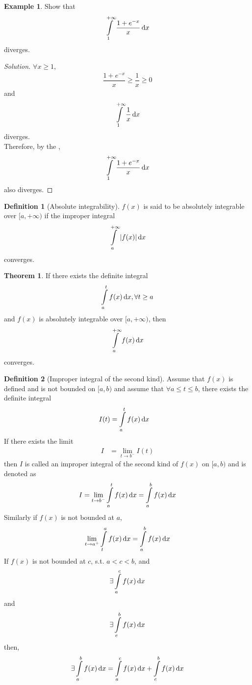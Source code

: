 \documentclass[fleqn, a4paper, 12pt]{article}
\theoremstyle{definition}
\newtheorem{example}{Example}
\newtheorem{definition}{Definition}
\theoremstyle{theorem}
\newtheorem{theorem}{Theorem}
\theoremstyle{remark}
\newenvironment{solution}
{\begin{proof}[Solution]\let\qed\relax}
	{\end{proof}}
\begin{document}
\begin{example}
	Show that \[\int\limits_{1}^{+\infty} \dfrac{1 + e^{-x}}{x} \dif x\] diverges.
\end{example}

\begin{solution}
	$\forall x \geq 1$,
	\begin{align*}
		\dfrac{1 + e^{-x}}{x} \geq \dfrac{1}{x} \geq 0
	\end{align*}
	and \[\int\limits_{1}^{+\infty} \dfrac{1}{x} \dif x\] diverges.\\
	Therefore, by the ,	\[\int\limits_{1}^{+\infty} \dfrac{1 + e^{-x}}{x} \dif x\]
	also diverges.
\end{solution}

\begin{definition}[Absolute integrability]
	$f(x)$ is said to be absolutely integrable over $[a, +\infty)$ if the improper integral
	\[\int\limits_{a}^{+\infty} |f(x)| \dif x\]
	converges.
\end{definition}

\begin{theorem}
	If there exists the definite integral \[\int\limits_{a}^{t} f(x) \dif x, \forall t \geq a\] and $f(x)$ is absolutely integrable over $[a, +\infty)$, then \[\int\limits_{a}^{+\infty} f(x) \dif x\] converges.
\end{theorem}

\begin{definition}[Improper integral of the second kind]
	Assume that $f(x)$ is defined and is not bounded on $[a, b)$ and assume that $\forall a \leq t \leq b$, there exists the definite integral
	\begin{align*}
		I(t) &= \int\limits_{a}^{t} f(x) \dif x
	\end{align*}
	If there exists the limit
	\begin{align*}
		I &= \lim\limits_{t \to b^-} I(t)
	\end{align*}
	then $I$ is called an improper integral of the second kind of $f(x)$ on $[a, b)$ and is denoted as
	\begin{equation*}
		I = \lim\limits_{t \to b^-} \int\limits_{a}^{t} f(x) \dif x = \int\limits_{a}^{b} f(x) \dif x
	\end{equation*}
	Similarly if $f(x)$ is not bounded at $a$, 
	\begin{equation*}
		\lim\limits_{t \to a^+} \int\limits_{t}^{a} f(x) \dif x = \int\limits_{a}^{b} f(x) \dif x
	\end{equation*}
	If $f(x)$ is not bounded at $c$, s.t. $a < c < b$, and \[\exists \int\limits_{a}^{c} f(x) \dif x\] and \[\exists \int\limits_{c}^{b} f(x) \dif x\] then, 
	\begin{equation*}
		\exists \int\limits_{a}^{b} f(x) \dif x = \int\limits_{a}^{c} f(x) \dif x + \int\limits_{c}^{b} f(x) \dif x
	\end{equation*}
\end{definition}
\end{document}
